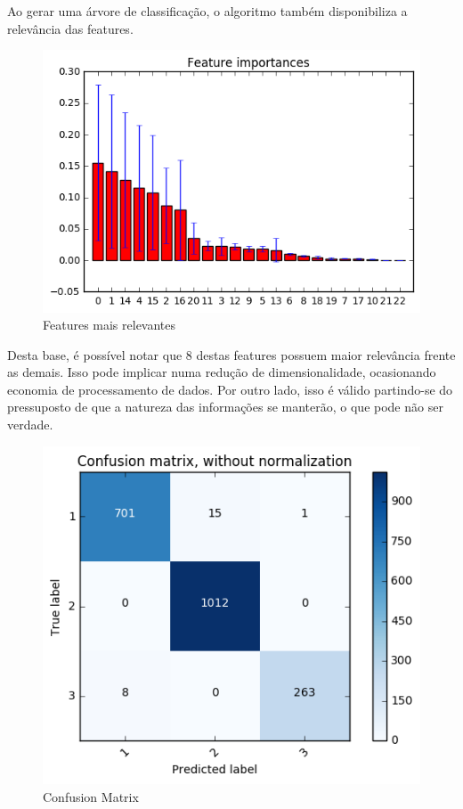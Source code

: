 Ao gerar uma árvore de classificação, o algoritmo também disponibiliza a relevância das features.

\begin{figure}[!ht]
\caption{Features mais relevantes}
\centerline{\includegraphics[width=.7\textwidth]{img/tree-most-important-features}}
\end{figure}

Desta base, é possível notar que 8 destas features possuem maior relevância frente as demais. Isso pode implicar numa redução de dimensionalidade, ocasionando economia de processamento de dados. Por outro lado, isso é válido partindo-se do pressuposto de que a natureza das informações se manterão, o que pode não ser verdade.

%
%


\begin{figure}[!ht]
\caption{Confusion Matrix}
\centerline{\includegraphics[width=.7\textwidth]{img/confusionMatrix}}
\end{figure}



